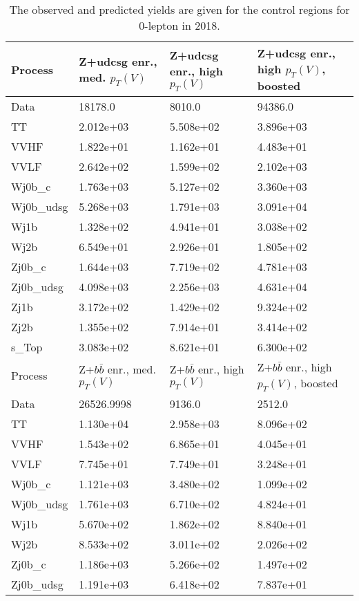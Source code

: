 \begin{table}
\centering
\caption[2018 0-lepton control region yields]{
                  The observed and predicted yields are given for the
                  control regions for 0-lepton in 2018.
                  }
{\footnotesize
\begin{tabularx}{0.8\textwidth}{|X|X|X|X|}
\hline
Process & Z+udcsg enr., med. $p_{T}(V)$ & Z+udcsg enr., high $p_{T}(V)$ & Z+udcsg enr., high $p_{T}(V)$, boosted \\
\hline
Data & 18178.0 & 8010.0 & 94386.0 \\
\hline
TT & 2.012e+03 & 5.508e+02 & 3.896e+03 \\
VVHF & 1.822e+01 & 1.162e+01 & 4.483e+01 \\
VVLF & 2.642e+02 & 1.599e+02 & 2.102e+03 \\
Wj0b\_c & 1.763e+03 & 5.127e+02 & 3.360e+03 \\
Wj0b\_udsg & 5.268e+03 & 1.791e+03 & 3.091e+04 \\
Wj1b & 1.328e+02 & 4.941e+01 & 3.038e+02 \\
Wj2b & 6.549e+01 & 2.926e+01 & 1.805e+02 \\
Zj0b\_c & 1.644e+03 & 7.719e+02 & 4.781e+03 \\
Zj0b\_udsg & 4.098e+03 & 2.256e+03 & 4.631e+04 \\
Zj1b & 3.172e+02 & 1.429e+02 & 9.324e+02 \\
Zj2b & 1.355e+02 & 7.914e+01 & 3.414e+02 \\
s\_Top & 3.083e+02 & 8.621e+01 & 6.300e+02 \\
\hline
\hline
Process & Z+$b\bar{b}$ enr., med. $p_{T}(V)$ & Z+$b\bar{b}$ enr., high $p_{T}(V)$ & Z+$b\bar{b}$ enr., high $p_{T}(V)$, boosted \\
\hline
Data & 26526.9998 & 9136.0 & 2512.0 \\
\hline
TT & 1.130e+04 & 2.958e+03 & 8.096e+02 \\
VVHF & 1.543e+02 & 6.865e+01 & 4.045e+01 \\
VVLF & 7.745e+01 & 7.749e+01 & 3.248e+01 \\
Wj0b\_c & 1.121e+03 & 3.480e+02 & 1.099e+02 \\
Wj0b\_udsg & 1.761e+03 & 6.710e+02 & 4.824e+01 \\
Wj1b & 5.670e+02 & 1.862e+02 & 8.840e+01 \\
Wj2b & 8.533e+02 & 3.011e+02 & 2.026e+02 \\
Zj0b\_c & 1.186e+03 & 5.266e+02 & 1.497e+02 \\
Zj0b\_udsg & 1.191e+03 & 6.418e+02 & 7.837e+01 \\

\end{tabularx}}
\end{table}
